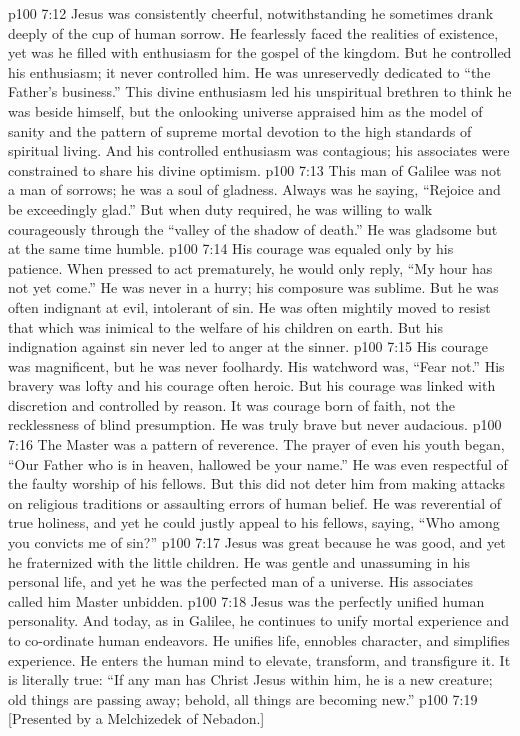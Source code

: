 \vs p100 7:12 Jesus was consistently cheerful, notwithstanding he sometimes drank deeply of the cup of human sorrow. He fearlessly faced the realities of existence, yet was he filled with enthusiasm for the gospel of the kingdom. But he controlled his enthusiasm; it never controlled him. He was unreservedly dedicated to \textcolor{ubdarkred}{“the Father’s business.”} This divine enthusiasm led his unspiritual brethren to think he was beside himself, but the onlooking universe appraised him as the model of sanity and the pattern of supreme mortal devotion to the high standards of spiritual living. And his controlled enthusiasm was contagious; his associates were constrained to share his divine optimism.
\vs p100 7:13 This man of Galilee was not a man of sorrows; he was a soul of gladness. Always was he saying, \textcolor{ubdarkred}{“Rejoice and be exceedingly glad.”} But when duty required, he was willing to walk courageously through the “valley of the shadow of death.” He was gladsome but at the same time humble.
\vs p100 7:14 His courage was equaled only by his patience. When pressed to act prematurely, he would only reply, \textcolor{ubdarkred}{“My hour has not yet come.”} He was never in a hurry; his composure was sublime. But he was often indignant at evil, intolerant of sin. He was often mightily moved to resist that which was inimical to the welfare of his children on earth. But his indignation against sin never led to anger at the sinner.
\vs p100 7:15 His courage was magnificent, but he was never foolhardy. His watchword was, \textcolor{ubdarkred}{“Fear not.”} His bravery was lofty and his courage often heroic. But his courage was linked with discretion and controlled by reason. It was courage born of faith, not the recklessness of blind presumption. He was truly brave but never audacious.
\vs p100 7:16 The Master was a pattern of reverence. The prayer of even his youth began, \textcolor{ubdarkred}{“Our Father who is in heaven, hallowed be your name.”} He was even respectful of the faulty worship of his fellows. But this did not deter him from making attacks on religious traditions or assaulting errors of human belief. He was reverential of true holiness, and yet he could justly appeal to his fellows, saying, \textcolor{ubdarkred}{“Who among you convicts me of sin?”}
\vs p100 7:17 Jesus was great because he was good, and yet he fraternized with the little children. He was gentle and unassuming in his personal life, and yet he was the perfected man of a universe. His associates called him Master unbidden.
\vs p100 7:18 Jesus was the perfectly unified human personality. And today, as in Galilee, he continues to unify mortal experience and to co\hyp{}ordinate human endeavors. He unifies life, ennobles character, and simplifies experience. He enters the human mind to elevate, transform, and transfigure it. It is literally true: “If any man has Christ Jesus within him, he is a new creature; old things are passing away; behold, all things are becoming new.”
\vsetoff
\vs p100 7:19 [Presented by a Melchizedek of Nebadon.]
